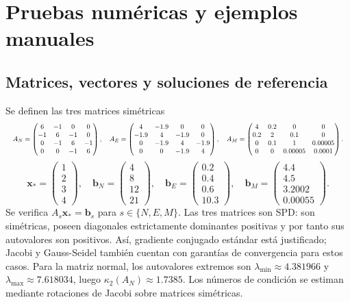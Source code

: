 \documentclass[letterpaper,11pt]{article}
\begin{document}
\section{Pruebas numéricas y ejemplos manuales}
\subsection{Matrices, vectores y soluciones de referencia}
Se definen las tres matrices simétricas
\begin{equation}\label{eq:matrices}
\resizebox{\linewidth}{!}{$\displaystyle
A_N=\begin{pmatrix}6&-1&0&0\\-1&6&-1&0\\0&-1&6&-1\\0&0&-1&6\end{pmatrix},\quad
A_E=\begin{pmatrix}4&-1.9&0&0\\-1.9&4&-1.9&0\\0&-1.9&4&-1.9\\0&0&-1.9&4\end{pmatrix},\quad
A_M=\begin{pmatrix}4&0.2&0&0\\0.2&2&0.1&0\\0&0.1&1&0.00005\\0&0&0.00005&0.0001\end{pmatrix}.
$}
\end{equation}
\begin{equation}\label{eq:vectores}
\boldsymbol{x}_*=\begin{pmatrix}1\\2\\3\\4\end{pmatrix},\quad
\boldsymbol{b}_N=\begin{pmatrix}4\\8\\12\\21\end{pmatrix},\quad
\boldsymbol{b}_E=\begin{pmatrix}0.2\\0.4\\0.6\\10.3\end{pmatrix},\quad
\boldsymbol{b}_M=\begin{pmatrix}4.4\\4.5\\3.2002\\0.00055\end{pmatrix}.
\end{equation}
Se verifica $A_s\boldsymbol{x}_*=\boldsymbol{b}_s$ para $s\in\{N,E,M\}$. Las tres matrices son SPD: son simétricas, poseen diagonales estrictamente dominantes positivas y por tanto sus autovalores son positivos. Así, gradiente conjugado estándar está justificado; Jacobi y Gauss-Seidel también cuentan con garantías de convergencia para estos casos. Para la matriz normal, los autovalores extremos son $\lambda_{\min}\approx4.381966$ y $\lambda_{\max}\approx7.618034$, luego $\kappa_2(A_N)\approx1.7385$. Los números de condición se estiman mediante rotaciones de Jacobi sobre matrices simétricas.
\end{document}

